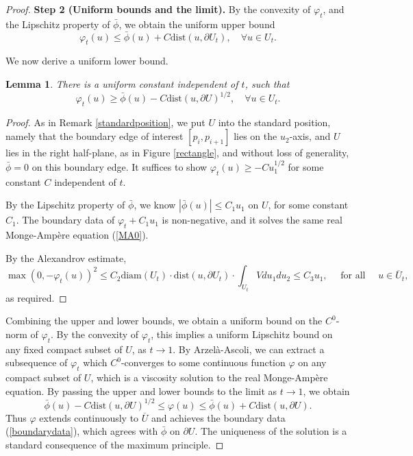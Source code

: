 \documentclass[11pt]{article}
\newtheorem{lemma}{Lemma}
\begin{document}
\begin{proof}
\textbf{Step 2 (Uniform bounds and the limit).} By the convexity of $\varphi_t$, and the Lipschitz property of $\bar{\phi}$, we obtain the uniform upper bound
\[
\varphi_t(u) \leq \bar{\phi}(u)+ C \text{dist}(u, \partial U_t),\quad \forall u\in U_t.
\]


We now derive a uniform lower bound.

\begin{lemma}\label{Lemma}
There is a uniform constant independent of $t$, such that 
\[
\varphi_t (u) \geq  \bar{\phi}(u)- C \text{dist}(u, \partial U)^{1/2},\quad \forall u\in U_t.
\]
\end{lemma}



\begin{proof} 
As in Remark \ref{standardposition}, we put $U$ into the standard position, namely that the boundary edge of interest $[p_i,p_{i+1}]$ lies on the $u_2$-axis, and $U$ lies in the right half-plane, as in Figure \ref{rectangle}, and without loss of generality, $\bar{\phi}=0$ on this boundary edge. It suffices to show $\varphi_t(u)\geq -Cu_1^{1/2}$ for some constant $C$ independent of $t$.

By the Lipschitz property of $\bar{\phi}$, we know $|\bar{\phi}(u)|\leq C_1 u_1$ on $U$, for some constant $C_1$. The boundary data of $\varphi_t+C_1u_1$ is non-negative, and it solves the same real Monge-Amp\`ere equation (\ref{MA0}).

By the Alexandrov estimate,
\[
\max(0, - \varphi_t(u))^2 \leq C_2 \text{diam}(U_t) \cdot \text{dist} (u, \partial U_t)  \cdot \int_{U_t} V du_1 du_2 \leq C_3 u_1, \quad \text{ for all } \quad u \in \overline{U}_t,
\]
as required.
\end{proof}





Combining the upper and lower bounds, we obtain a uniform bound on the $C^0$-norm of $\varphi_t$. By the convexity of $\varphi_t$, this implies a uniform Lipschitz bound on any fixed compact subset of $U$, as $t\to 1$. By Arzel\`a-Ascoli, we can extract a subsequence of $\varphi_t$ which $C^0$-converges to some continuous function $\varphi$ on any compact subset of $U$, which is a viscosity solution to the real Monge-Amp\`ere equation. By passing the upper and lower bounds to the limit as $t\to 1$, we obtain
\begin{equation}\label{boundarycontinuity}
\bar{\phi}(u)- C\text{dist}(u, \partial U)^{1/2} \leq \varphi(u)\leq \bar{\phi}(u)+ C\text{dist}(u, \partial U). 
\end{equation}
Thus $\varphi$ extends continuously to $\overline{U}$ and achieves the boundary data (\ref{boundarydata}), which agrees with $\bar{\phi}$ on $\partial U$. The uniqueness of the solution is a standard consequence of the maximum principle.


\end{proof}
\end{document}
